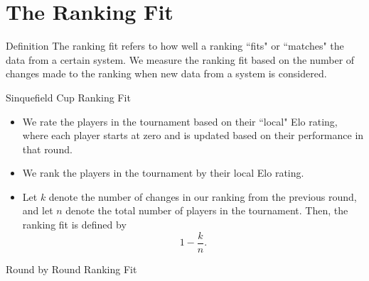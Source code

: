 \documentclass{beamer}
\begin{document}
\section{The Ranking Fit}

\begin{frame}{Definition}
The ranking fit refers to how well a ranking ``fits" or ``matches" the data from a certain system.
\vfill
We measure the ranking fit based on the number of changes made to the ranking when new data from a system is considered.
\end{frame}

\begin{frame}{Sinquefield Cup Ranking Fit}
\begin{itemize}
\item	We rate the players in the tournament based on their ``local" Elo rating, where each player starts at zero and is updated based on their performance in that round.
\vfill
\item	We rank the players in the tournament by their local Elo rating.
\vfill
\item Let $k$ denote the number of changes in our ranking from the previous round, and let $n$ denote the total number of players in the tournament.
	Then, the ranking fit is defined by
	\[
	1 - \frac{k}{n}.
	\] 
\end{itemize}
\end{frame}

\begin{frame}{Round by Round Ranking Fit}
\centering
{}
\end{frame}
\end{document}
